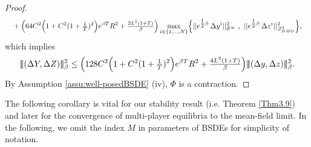 \documentclass[10pt,a4paper]{article}
\theoremstyle{plain}
\theoremstyle{definition}
\numberwithin{equation}{section}
\newcommand{\trinm}[1]{\vert\!\vert\!\vert #1 \vert\!\vert\!\vert}
\begin{document}
\begin{proof}
\begin{align*}
&\ \ \ + \Bigl(64C^{2}\Bigl(1+C^{2}(1+\tfrac{1}{T})^{2}\Bigr)e^{\beta T}R^{2} + \tfrac{2L^{2}(1+T)}{\beta}\Bigr)\max_{i \in \{1,...,N\}}\Bigl\{||e^{\tfrac{1}{2}\beta\cdot}\Delta y^{i}||_{\mathcal{S}^{\infty}}^{2} \ , \ ||e^{\tfrac{1}{2}\beta\cdot}\Delta z^{i}||_{\mathcal{Z}_{BMO}^{2}}^{2}\Bigr\},
\end{align*}
which implies
\begin{equation}
\label{equ:Ndimcontraction}
\trinm{(\Delta Y,\Delta Z)}_\beta^{2} \leq \Bigl(128C^{2}\Bigl(1+C^{2}(1+\tfrac{1}{T})^{2}\Bigr)e^{\beta T}R^{2} + \tfrac{4L^{2}(1+T)}{\beta}\Bigr)\trinm{(\Delta y,\Delta z)}_\beta^{2}.
\end{equation}
By Assumption \ref{assu:well-posedBSDE} (iv), $\Phi$ is a contraction. 

\end{proof}


The following corollary is vital for our stability result (i.e. Theorem \ref{Thm3.9}) and later for the convergence of multi-player equilibria to the mean-field limit. In the following, we omit the index $M$ in parameters of BSDEs for simplicity of notation.
\end{document}
